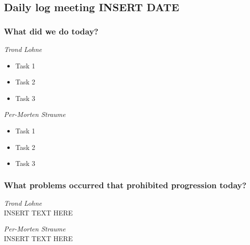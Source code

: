 \documentclass{article}
\begin{document}
\begin{center}
\subsection*{Daily log meeting INSERT DATE}
\end{center}
\bigskip


\subsubsection*{What did we do today?}

\noindent\textit{Trond Lohne}
\begin{itemize}
	\item 
	Task 1
	
	\item 
	Task 2
	
	\item 
	Task 3
\end{itemize}

\medskip

\noindent\textit{Per-Morten Straume}
\begin{itemize}
	\item 
	Task 1
	
	\item 
	Task 2
	
	\item 
	Task 3
\end{itemize}

\subsubsection*{What problems occurred that prohibited progression today?}

\noindent\textit{Trond Lohne}\\
INSERT TEXT HERE

\medskip

\noindent\textit{Per-Morten Straume}\\
INSERT TEXT HERE
\end{document}
